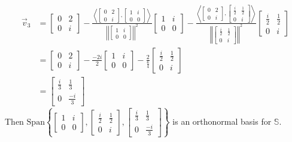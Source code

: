 \documentclass[10pt,english]{article}
\begin{document}
\begin{enumerate}
\begin{align*}
\end{align*} 
\begin{align*}
\vec{v}_3&=\begin{bmatrix}0&2\\0&i\end{bmatrix}-\frac{\left\langle\begin{bmatrix}0&2\\0&i\end{bmatrix},\begin{bmatrix}1&i\\0&0\end{bmatrix}\right\rangle}{\left|\left|\begin{bmatrix}1&i\\0&0\end{bmatrix}\right|\right|^2}\begin{bmatrix}1&i\\0&0\end{bmatrix}-\frac{\left\langle\begin{bmatrix}0&2\\0&i\end{bmatrix},\begin{bmatrix}\frac{i}{2}&\frac{1}{2}\\0&i\end{bmatrix}\right\rangle}{\left|\left|\begin{bmatrix}\frac{i}{2}&\frac{1}{2}\\0&i\end{bmatrix}\right|\right|^2}\begin{bmatrix}\frac{i}{2}&\frac{1}{2}\\0&i\end{bmatrix}\\&=\begin{bmatrix}0&2\\0&i\end{bmatrix}-\frac{-2i}{2}\begin{bmatrix}1&i\\0&0\end{bmatrix}-\frac{2}{\frac{6}{4}}\begin{bmatrix}\frac{i}{2}&\frac{1}{2}\\0&i\end{bmatrix}\\&=\begin{bmatrix}\frac{i}{3}&\frac{1}{3}\\0&\frac{-i}{3}\end{bmatrix}
\end{align*}
Then $\text{Span}\left\{\begin{bmatrix}1&i\\0&0\end{bmatrix},\begin{bmatrix}\frac{i}{2}&\frac{1}{2}\\0&i\end{bmatrix},\begin{bmatrix}\frac{i}{3}&\frac{1}{3}\\0&\frac{-i}{3}\end{bmatrix}\right\}$ is an orthonormal basis for $\mathbb{S}$. 


\end{enumerate}
\end{document}
